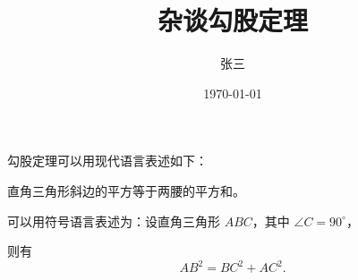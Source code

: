 \documentclass{article} %
\title{\heiti 杂谈勾股定理} %
\author{\kaishu 张三}
\date{\today}
\newcommand\degree{^\circ} %
\begin{document}
    \maketitle

    勾股定理可以用现代语言表述如下：

    直角三角形斜边的平方等于两腰的平方和。

    可以用符号语言表述为：设直角三角形 $ABC$，其中 $\angle C=90\degree$，

    则有
    \begin{equation} %
    AB^2 = BC^2 + AC^2.
    \end{equation}
\end{document}
